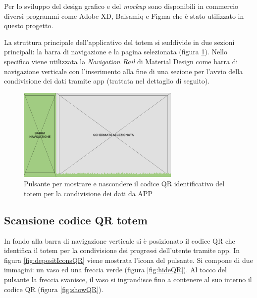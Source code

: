 Per lo sviluppo del design grafico e del \textit{mockup} sono disponibili in commercio diversi programmi come Adobe XD, Balsamiq e Figma che è stato utilizzato in questo progetto.

La struttura principale dell'applicativo del totem si suddivide in due sezioni principali: la barra di navigazione e la pagina selezionata (figura \ref{fig:viewStruct}).
Nello specifico viene utilizzata la \textit{Navigation Rail} di Material Design come barra di navigazione verticale con l'inserimento alla fine di una sezione per l'avvio della condivisione dei dati tramite app (trattata nel dettaglio di seguito).

\begin{figure} [h]
    \centering
    \includegraphics[width=0.7\textwidth]{img/mainStructure.png}
    \caption{Pulsante per mostrare e nascondere il codice QR identificativo del totem per la condivisione dei dati da APP}
    \label{fig:viewStruct}
\end{figure}

\subsection{Scansione codice QR totem}
In fondo alla barra di navigazione verticale si è posizionato il codice QR che identifica il totem per la condivisione dei progressi dell'utente tramite app.
In figura \ref{fig:depositIconsQR} viene mostrata l'icona del pulsante. Si compone di due immagini: un vaso ed una freccia verde (figura \ref{fig:hideQR}). Al tocco del pulsante la freccia svanisce, il vaso si ingrandisce fino a contenere al suo interno il codice QR (figura \ref{fig:showQR}).

